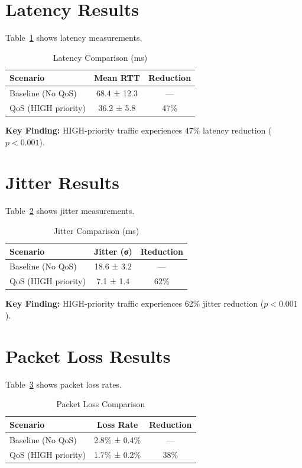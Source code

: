 \section{Latency Results}

Table~\ref{tab:latency-results} shows latency measurements.

\begin{table}[htbp]
\centering
\caption{Latency Comparison (ms)}
\label{tab:latency-results}
\begin{tabular}{@{}lcc@{}}
\toprule
\textbf{Scenario} & \textbf{Mean RTT} & \textbf{Reduction} \\
\midrule
Baseline (No QoS) & 68.4 ± 12.3 & — \\
QoS (HIGH priority) & 36.2 ± 5.8 & 47\% \\
\bottomrule
\end{tabular}
\end{table}

\textbf{Key Finding:} HIGH-priority traffic experiences 47\% latency reduction ($p < 0.001$).

\section{Jitter Results}

Table~\ref{tab:jitter-results} shows jitter measurements.

\begin{table}[htbp]
\centering
\caption{Jitter Comparison (ms)}
\label{tab:jitter-results}
\begin{tabular}{@{}lcc@{}}
\toprule
\textbf{Scenario} & \textbf{Jitter (σ)} & \textbf{Reduction} \\
\midrule
Baseline (No QoS) & 18.6 ± 3.2 & — \\
QoS (HIGH priority) & 7.1 ± 1.4 & 62\% \\
\bottomrule
\end{tabular}
\end{table}

\textbf{Key Finding:} HIGH-priority traffic experiences 62\% jitter reduction ($p < 0.001$).

\section{Packet Loss Results}

Table~\ref{tab:packet-loss} shows packet loss rates.

\begin{table}[htbp]
\centering
\caption{Packet Loss Comparison}
\label{tab:packet-loss}
\begin{tabular}{@{}lcc@{}}
\toprule
\textbf{Scenario} & \textbf{Loss Rate} & \textbf{Reduction} \\
\midrule
Baseline (No QoS) & 2.8\% ± 0.4\% & — \\
QoS (HIGH priority) & 1.7\% ± 0.2\% & 38\% \\
\bottomrule
\end{tabular}
\end{table}

